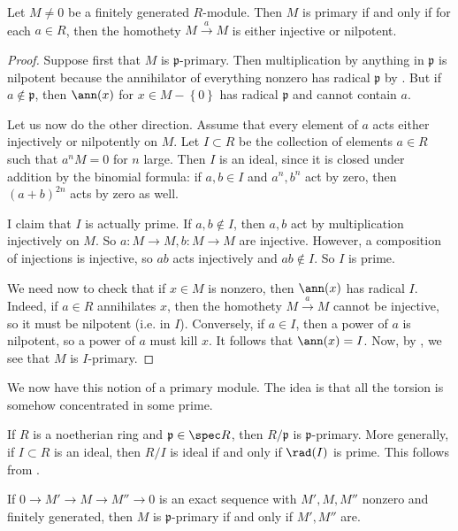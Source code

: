 \begin{proposition} \label{whenisprimary2}
Let $M \neq 0$ be a finitely generated $R$-module. Then $M$ is primary if and
only if for each $a \in
R$, then the homothety $ M \stackrel{a}{\to} M$ is either injective or nilpotent.
\end{proposition}
\begin{proof} 
Suppose first that $M$ is $\mathfrak{p}$-primary. Then multiplication by anything in
$\mathfrak{p}$ is nilpotent because the annihilator of everything nonzero has
radical $\mathfrak{p}$ by . But if $a \notin \mathfrak{p}$, then $\ann(x)$ for
$x \in M - \left\{0\right\}$ has radical $\mathfrak{p}$ and cannot contain $a$. 

Let us now do the other direction. Assume that every element of $a$ acts either injectively or nilpotently on $M$.
Let $I \subset R$ be the collection of elements $a \in R$ such that $a^n M = 0$
for $n$ large. Then $I$ is an ideal, since it is closed under addition by the
binomial formula: if $a, b \in I$ and $a^n, b^n$ act by zero, then $(a+b)^{2n}$
acts by zero as well.


I claim that $I$ is actually prime. If $a,b \notin I$, then  $a,b$ act by
multiplication injectively on $M$. So $a: M \to M, b: M \to M$ are injective.
However, a composition of injections is injective, so $ab$ acts injectively and
$ab \notin I$. So $I$ is prime.

We need now to check that if $x \in M$ is nonzero, then $\ann(x)$ has radical
$I$. Indeed, if $a \in R$   annihilates $x$,
then the homothety  $M \stackrel{a}{\to} M$ cannot be injective, so it must be
nilpotent (i.e. in $I$). Conversely, if $a \in I$, then a power of $a$ is
nilpotent, so a power of $a$ 
must kill $x$. 
It follows that $\ann(x) = I$. Now, by , we see
that $M$ is $I$-primary.
\end{proof} 

We now have this notion of a primary module. The idea is that all the torsion is
somehow concentrated in some prime.

\begin{example} 
If $R$ is a noetherian ring and $\mathfrak{p} \in \spec R$, then
$R/\mathfrak{p}$ is $\mathfrak{p}$-primary. More generally, if $I \subset R$
is an ideal, then $R/I$ is ideal if and only if $\rad(I) $ is prime. This
follows from .
\end{example} 

\begin{exercise} 
If $0 \to M' \to M \to M'' \to 0$ is an exact sequence with $M', M, M''$
nonzero and finitely generated, then $M$ is $\mathfrak{p}$-primary if and only if $M', M''$ are.
\end{exercise} 

